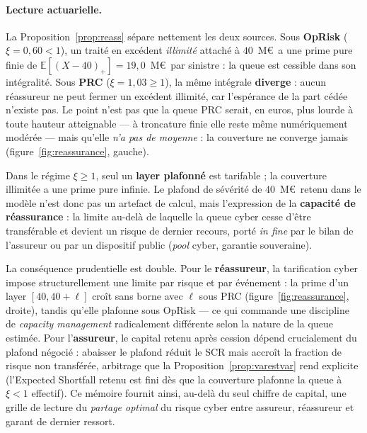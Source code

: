 \documentclass[11pt,a4paper]{article}
\theoremstyle{navystyle}
\theoremstyle{navydef}
\newcommand{\E}{\mathbb{E}}
\begin{document}
\paragraph{Lecture actuarielle.} La Proposition~\ref{prop:reass} sépare nettement les deux sources. Sous \textbf{OpRisk} ($\xi=0{,}60<1$), un traité en excédent \emph{illimité} attaché à $40$~M\euro\ a une prime pure finie de $\E[(X-40)_+]=19{,}0$~M\euro\ par sinistre : la queue est cessible dans son intégralité. Sous \textbf{PRC} ($\xi=1{,}03\ge1$), la même intégrale \textbf{diverge} : aucun réassureur ne peut fermer un excédent illimité, car l'espérance de la part cédée n'existe pas. Le point n'est pas que la queue PRC serait, en euros, plus lourde à toute hauteur atteignable --- à troncature finie elle reste même numériquement modérée --- mais qu'elle \emph{n'a pas de moyenne} : la couverture ne converge jamais (figure~\ref{fig:reassurance}, gauche).

\begin{formulekey}
Dans le régime $\xi\ge1$, seul un \textbf{layer plafonné} est tarifable ; la couverture illimitée a une prime pure infinie. Le plafond de sévérité de $40$~M\euro\ retenu dans le modèle n'est donc pas un artefact de calcul, mais l'expression de la \textbf{capacité de réassurance} : la limite au-delà de laquelle la queue cyber cesse d'être transférable et devient un risque de dernier recours, porté \emph{in fine} par le bilan de l'assureur ou par un dispositif public (\emph{pool} cyber, garantie souveraine).
\end{formulekey}

\noindent La conséquence prudentielle est double. Pour le \textbf{réassureur}, la tarification cyber impose structurellement une limite par risque et par événement : la prime d'un layer $[40,40+\ell]$ croît sans borne avec $\ell$ sous PRC (figure~\ref{fig:reassurance}, droite), tandis qu'elle plafonne sous OpRisk --- ce qui commande une discipline de \emph{capacity management} radicalement différente selon la nature de la queue estimée. Pour l'\textbf{assureur}, le capital retenu après cession dépend crucialement du plafond négocié : abaisser le plafond réduit le SCR mais accroît la fraction de risque non transférée, arbitrage que la Proposition~\ref{prop:varestvar} rend explicite (l'Expected Shortfall retenu est fini dès que la couverture plafonne la queue à $\xi<1$ effectif). Ce mémoire fournit ainsi, au-delà du seul chiffre de capital, une grille de lecture du \emph{partage optimal} du risque cyber entre assureur, réassureur et garant de dernier ressort.
\end{document}
